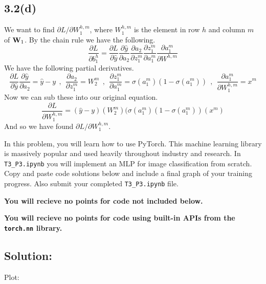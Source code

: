 \documentclass[submit]{harvardml}
\begin{document}
\subsection*{3.2(d)}
We want to find $\partial L / \partial W_1^{h, m}$, where $W_1^{h, m}$ is the element in row $h$ and column $m$ of $\vb{W}_1$. By the chain rule we have the following.
\begin{equation*}
    \frac{\partial L}{\partial b_1^h} = \frac{\partial L}{\partial \hat{y}}  \frac{\partial \hat{y}}{\partial a_2}  \frac{\partial a_2}{\partial z_1^m}  \frac{\partial z_1^m}{\partial a_1^m}  \frac{\partial a_1^m}{\partial W^{h, m}}
\end{equation*}
We have the following partial derivatives.
\begin{equation*}
    \frac{\partial L}{\partial \hat{y}} \frac{\partial \hat{y}}{\partial a_2} = \hat{y} - y \ \ , \ \ \frac{\partial a_2}{\partial z_1^m} = W_2^m \ \ , \ \  \frac{\partial z_1^m}{\partial a_1^m} = \sigma(a_1^m)(1 - \sigma(a_1^m)) \ \ , \ \ \frac{\partial a_1^m}{\partial W_1^{h, m}} = x^m
\end{equation*}
Now we can sub these into our original equation.
\begin{equation*}
    \boxed{\frac{\partial L}{\partial W_1^{h, m}} = (\hat{y} - y)(W_2^m)(\sigma(a_1^m)(1 - \sigma(a_1^m))(x^m)}
\end{equation*}
And so we have found $\partial L / \partial W_1^{h, m}$.

\newpage

\begin{problem}
  In this problem, you will learn how to use PyTorch. This machine learning library is massively popular and used heavily throughout industry and research. In \verb|T3_P3.ipynb| you will implement an MLP for image classification from scratch. Copy and paste code solutions below and include a final graph of your training progress. Also submit your completed \verb|T3_P3.ipynb| file.

  {\bfseries You will recieve no points for code not included below.}

  {\bfseries You will recieve no points for code using built-in APIs from the \verb|torch.nn| library.}
  
\end{problem}


\subsection*{Solution:}
Plot:
\end{document}
